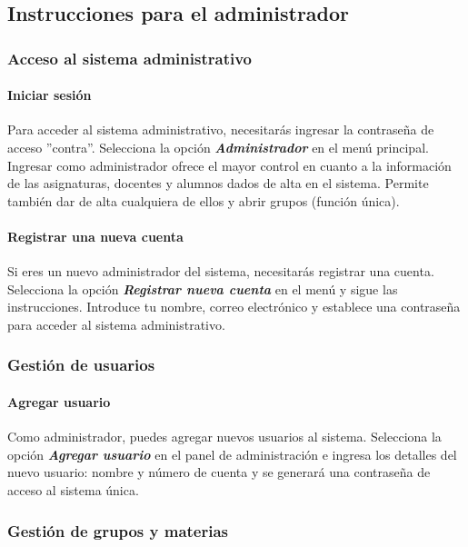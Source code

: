 \documentclass[a4paper,12pt]{article}
\begin{document}
\subsection{Instrucciones para el administrador}

\subsubsection{Acceso al sistema administrativo}

\paragraph{Iniciar sesión}
Para acceder al sistema administrativo, necesitarás ingresar la contraseña de acceso ''contra''. Selecciona la opción \textit{\textbf{Administrador}} en el menú principal. Ingresar como administrador ofrece el mayor control en cuanto a la información de las asignaturas, docentes y alumnos dados de alta en el sistema. Permite también dar de alta cualquiera de ellos y abrir grupos (función única).

\paragraph{Registrar una nueva cuenta}
Si eres un nuevo administrador del sistema, necesitarás registrar una cuenta. Selecciona la opción \textbf{\textit{Registrar nueva cuenta}} en el menú y sigue las instrucciones. Introduce tu nombre, correo electrónico y establece una contraseña para acceder al sistema administrativo.

\subsubsection{Gestión de usuarios}

\paragraph{Agregar usuario}
Como administrador, puedes agregar nuevos usuarios al sistema. Selecciona la opción \textit{\textbf{Agregar usuario}} en el panel de administración e ingresa los detalles del nuevo usuario: nombre y número de cuenta y se generará una contraseña de acceso al sistema única.

\subsubsection{Gestión de grupos y materias}
\end{document}

